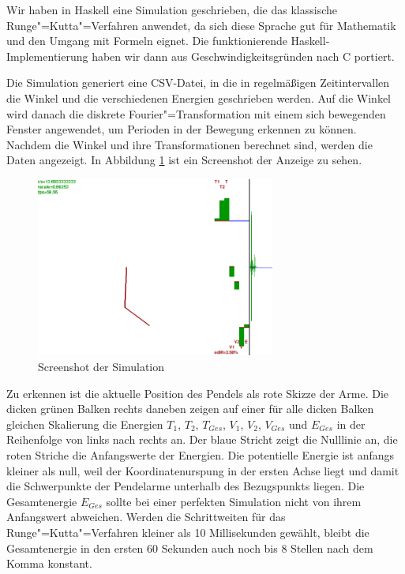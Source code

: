 Wir haben in Haskell eine Simulation geschrieben, die das klassische Runge"=Kutta"=Verfahren anwendet, da sich diese Sprache gut für Mathematik und den Umgang mit Formeln eignet. Die funktionierende Haskell-Implementierung haben wir dann aus Geschwindigkeitsgründen nach C portiert.

Die Simulation generiert eine CSV-Datei, in die in regelmäßigen Zeitintervallen die Winkel und die verschiedenen Energien geschrieben werden.
Auf die Winkel wird danach die diskrete Fourier"=Transformation mit einem sich bewegenden Fenster angewendet, um Perioden in der Bewegung erkennen zu können.
Nachdem die Winkel und ihre Transformationen berechnet sind, werden die Daten angezeigt.
In Abbildung \ref{fig:hssim} ist ein Screenshot der Anzeige zu sehen.

\begin{figure}[bht]
  \centering
  \includegraphics[width=0.7\textwidth]{images/haskell_simulation_fwindow1000_whitebg_cropped.png}
  \caption{Screenshot der Simulation}
  \label{fig:hssim}
\end{figure}

Zu erkennen ist die aktuelle Position des Pendels als rote Skizze der Arme.
Die dicken grünen Balken rechts daneben zeigen auf einer für alle dicken Balken gleichen Skalierung die Energien $T_1$, $T_2$, $T_{Ges}$, $V_1$, $V_2$, $V_{Ges}$ und $E_{Ges}$ in der Reihenfolge von links nach rechts an.
Der blaue Stricht zeigt die Nulllinie an, die roten Striche die Anfangswerte der Energien.
Die potentielle Energie ist anfangs kleiner als null, weil der Koordinatenurspung in der ersten Achse liegt und damit die Schwerpunkte der Pendelarme unterhalb des Bezugspunkts liegen.
Die Gesamtenergie $E_{Ges}$ sollte bei einer perfekten Simulation nicht von ihrem Anfangswert abweichen.
Werden die Schrittweiten für das Runge"=Kutta"=Verfahren kleiner als 10 Millisekunden gewählt, bleibt die Gesamtenergie in den ersten 60 Sekunden auch noch bis 8 Stellen nach dem Komma konstant.

